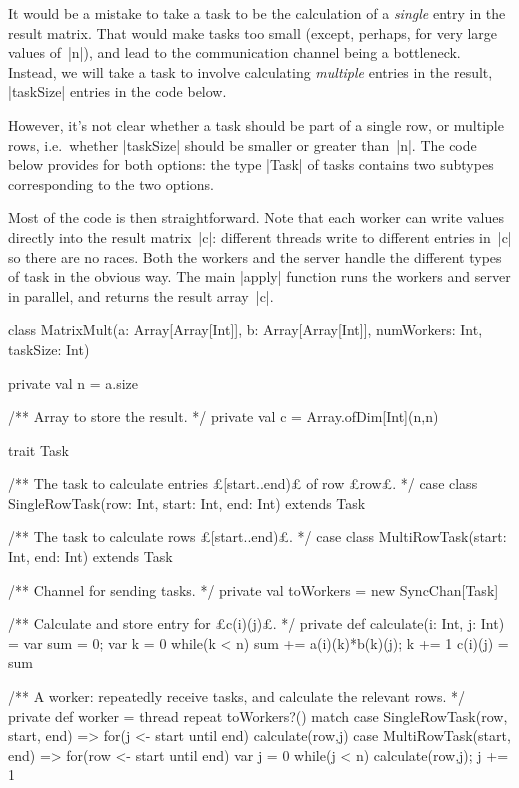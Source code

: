 \begin{answerI}
It would be a mistake to take a task to be the calculation of a \emph{single}
entry in the result matrix.  That would make tasks too small (except, perhaps,
for very large values of~|n|), and lead to the communication channel being a
bottleneck.  Instead, we will take a task to involve calculating
\emph{multiple} entries in the result, |taskSize| entries in the code below.  

However, it's not clear whether a task should be part of a single row, or
multiple rows, i.e.~whether |taskSize| should be smaller or greater than~|n|.
The code below provides for both options: the type |Task| of tasks contains
two subtypes corresponding to the two options.

Most of the code is then straightforward.  Note that each worker can write
values directly into the result matrix~|c|: different threads write to
different entries in~|c| so there are no races.  Both the workers and the
server handle the different types of task in the obvious way.  The main
|apply| function runs the workers and server in parallel, and returns the
result array~|c|.
%
\begin{scala}
class MatrixMult(a: Array[Array[Int]], b: Array[Array[Int]],
             numWorkers: Int, taskSize: Int){
  private val n = a.size

  /** Array to store the result. */
  private val c = Array.ofDim[Int](n,n)

  trait Task

  /** The task to calculate entries £[start..end)£ of row £row£. */
  case class SingleRowTask(row: Int, start: Int, end: Int) extends Task 

  /** The task to calculate rows £[start..end)£. */
  case class MultiRowTask(start: Int, end: Int) extends Task

  /** Channel for sending tasks. */
  private val toWorkers = new SyncChan[Task] 

  /** Calculate and store entry for £c(i)(j)£. */
  private def calculate(i: Int, j: Int) = {
    var sum = 0; var k = 0
    while(k < n){ sum += a(i)(k)*b(k)(j); k += 1 }
    c(i)(j) = sum
  }

  /** A worker: repeatedly receive tasks, and calculate the relevant rows. */
  private def worker = thread{
    repeat{
      toWorkers?() match{
        case SingleRowTask(row, start, end) =>
          for(j <- start until end) calculate(row,j)
        case MultiRowTask(start, end) => 
          for(row <- start until end){
            var j = 0
            while(j < n){ calculate(row,j); j += 1 }
          }
      }
    }
  }

}
\end{scala}
\end{answerI}
